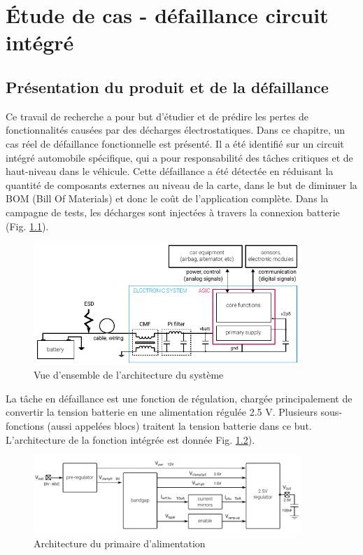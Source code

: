 \chapter{Étude de cas - défaillance circuit intégré}
\label{chap:3}
\section{Présentation du produit et de la défaillance}

Ce travail de recherche a pour but d'étudier et de prédire les pertes de fonctionnalités causées par des décharges électrostatiques.
Dans ce chapitre, un cas réel de défaillance fonctionnelle est présenté.
Il a été identifié sur un circuit intégré automobile spécifique, qui a pour responsabilité des tâches critiques et de haut-niveau dans le véhicule.
Cette défaillance a été détectée en réduisant la quantité de composants externes au niveau de la carte, dans le but de diminuer la BOM (Bill Of Materials) et donc le coût de l'application complète.
Dans la campagne de tests, les décharges sont injectées à travers la connexion batterie (Fig. \ref{fig:system_architecture}).

\begin{figure}[!h]
  \centering
  \includegraphics[width=0.9\textwidth]{src/1/figures/architecture_system.pdf}
  \caption{Vue d'ensemble de l'architecture du système}
  \label{fig:system_architecture}
\end{figure}

La tâche en défaillance est une fonction de régulation, chargée principalement de convertir la tension batterie en une alimentation régulée 2.5 V.
Plusieurs sous-fonctions (aussi appelées blocs) traitent la tension batterie dans ce but.
L'architecture de la fonction intégrée est donnée Fig. \ref{fig:monitored_function}).

\begin{figure}[!h]
  \centering
  \includegraphics[width=0.9\textwidth]{src/1/figures/monitored_function.pdf}
  \caption{Architecture du primaire d'alimentation}
  \label{fig:monitored_function}
\end{figure}

